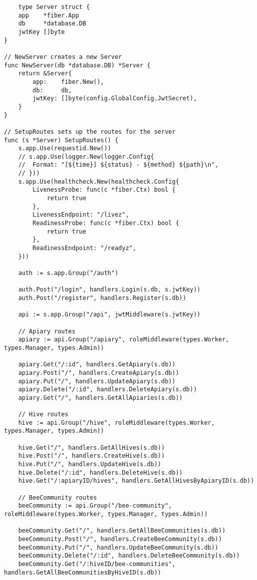 \documentclass{article}
\begin{document}
\begin{lstlisting}
    type Server struct {
	app    *fiber.App
	db     *database.DB
	jwtKey []byte
}

// NewServer creates a new Server
func NewServer(db *database.DB) *Server {
	return &Server{
		app:    fiber.New(),
		db:     db,
		jwtKey: []byte(config.GlobalConfig.JwtSecret),
	}
}

// SetupRoutes sets up the routes for the server
func (s *Server) SetupRoutes() {
	s.app.Use(requestid.New())
	// s.app.Use(logger.New(logger.Config{
	// 	Format: "[${time}] ${status} - ${method} ${path}\n",
	// }))
	s.app.Use(healthcheck.New(healthcheck.Config{
		LivenessProbe: func(c *fiber.Ctx) bool {
			return true
		},
		LivenessEndpoint: "/livez",
		ReadinessProbe: func(c *fiber.Ctx) bool {
			return true
		},
		ReadinessEndpoint: "/readyz",
	}))

	auth := s.app.Group("/auth")

	auth.Post("/login", handlers.Login(s.db, s.jwtKey))
	auth.Post("/register", handlers.Register(s.db))

	api := s.app.Group("/api", jwtMiddleware(s.jwtKey))

	// Apiary routes
	apiary := api.Group("/apiary", roleMiddleware(types.Worker, types.Manager, types.Admin))

	apiary.Get("/:id", handlers.GetApiary(s.db))
	apiary.Post("/", handlers.CreateApiary(s.db))
	apiary.Put("/", handlers.UpdateApiary(s.db))
	apiary.Delete("/:id", handlers.DeleteApiary(s.db))
	apiary.Get("/", handlers.GetAllApiaries(s.db))

	// Hive routes
	hive := api.Group("/hive", roleMiddleware(types.Worker, types.Manager, types.Admin))

	hive.Get("/", handlers.GetAllHives(s.db))
	hive.Post("/", handlers.CreateHive(s.db))
	hive.Put("/", handlers.UpdateHive(s.db))
	hive.Delete("/:id", handlers.DeleteHive(s.db))
	hive.Get("/:apiaryID/hives", handlers.GetAllHivesByApiaryID(s.db))

	// BeeCommunity routes
	beeCommunity := api.Group("/bee-community", roleMiddleware(types.Worker, types.Manager, types.Admin))

	beeCommunity.Get("/", handlers.GetAllBeeCommunities(s.db))
	beeCommunity.Post("/", handlers.CreateBeeCommunity(s.db))
	beeCommunity.Put("/", handlers.UpdateBeeCommunity(s.db))
	beeCommunity.Delete("/:id", handlers.DeleteBeeCommunity(s.db))
	beeCommunity.Get("/:hiveID/bee-communities", handlers.GetAllBeeCommunitiesByHiveID(s.db))


\end{lstlisting}
\end{document}
